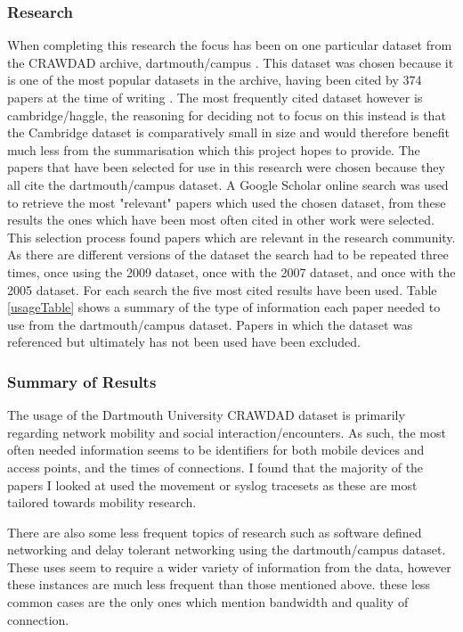 \subsubsection{Research}

When completing this research the focus has been on one particular dataset from the CRAWDAD archive, dartmouth/campus \cite{dartmouthcampus2009}. This dataset was chosen because it is one of the most popular datasets in the archive, having been cited by 374 papers at the time of writing \cite{aboutCrawdad2014}. The most frequently cited dataset however is cambridge/haggle, the reasoning for deciding not to focus on this instead is that the Cambridge dataset is comparatively small in size and would therefore benefit much less from the summarisation which this project hopes to provide.
\newline
The papers that have been selected for use in this research were chosen because they all cite the dartmouth/campus dataset. A Google Scholar \cite{googleScholar} online search was used to retrieve the most "relevant" papers which used the chosen dataset, from these results the ones which have been most often cited in other work were selected. This selection process found papers which are relevant in the research community. As there are different versions of the dataset the search had to be repeated three times, once using the 2009 dataset, once with the 2007 dataset, and once with the 2005 dataset. For each search the five most cited results have been used. Table \ref{usageTable} shows a summary of the type of information each paper needed to use from the dartmouth/campus dataset. Papers in which the dataset was referenced but ultimately has not been used have been excluded.



\subsubsection{Summary of Results}
The usage of the Dartmouth University CRAWDAD dataset is primarily regarding network mobility and social interaction/encounters. As such, the most often needed information seems to be identifiers for both mobile devices and access points, and the times of connections.
I found that the majority of the papers I looked at used the movement \cite{dartmouthcampus2009movement} or syslog \cite{dartmouthcampus2009syslog} tracesets as these are most tailored towards mobility research. 

There are also some less frequent topics of research such as software defined networking and delay tolerant networking using the dartmouth/campus dataset. These uses seem to require a wider variety of information from the data, however these instances are much less frequent than those mentioned above. these less common cases are the only ones which mention bandwidth and quality of connection.

